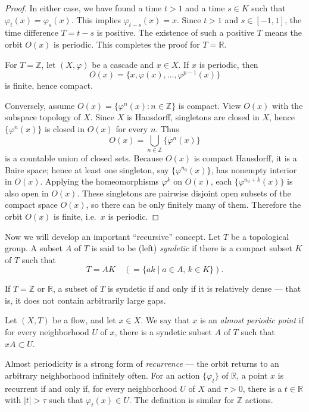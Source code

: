 \begin{proof}
    In either case, we have found a time $t > 1$ and a time $s \in K$ such that $\varphi_t(x) = \varphi_s(x)$. This implies $\varphi_{t-s}(x) = x$. Since $t>1$ and $s \in [-1, 1]$, the time difference $T = t-s$ is positive. The existence of such a positive $T$ means the orbit $O(x)$ is periodic.
    This completes the proof for $T = \mathbb{R}$.

    For $T = \mathbb{Z}$, let $(X,\varphi)$ be a cascade and $x\in X$. If $x$ is periodic, then
    \[
        O(x)=\{x,\varphi(x),\dots,\varphi^{p-1}(x)\}
    \]
    is finite, hence compact.

    Conversely, assume $O(x)=\{\varphi^n(x):n\in\mathbb Z\}$ is compact. View $O(x)$ with the subspace topology of $X$.
    Since $X$ is Hausdorff, singletons are closed in $X$, hence $\{\varphi^n(x)\}$ is closed in $O(x)$ for every $n$.
    Thus
    \[
        O(x)=\bigcup_{n\in\mathbb Z}\{\varphi^n(x)\}
    \]
    is a countable union of closed sets. Because $O(x)$ is compact Hausdorff, it is a Baire space; hence at least one
    singleton, say $\{\varphi^{n_0}(x)\}$, has nonempty interior in $O(x)$.
    Applying the homeomorphisms $\varphi^k$ on $O(x)$, each $\{\varphi^{n_0+k}(x)\}$ is also open in $O(x)$.
    These singletons are pairwise disjoint open subsets of the compact space $O(x)$, so there can be only finitely many of them.
    Therefore the orbit $O(x)$ is finite, i.e.\ $x$ is periodic.
\end{proof}



Now we will develop an important “recursive” concept. Let $T$ be a topological group. A subset $A$ of $T$ is said to be (left) \emph{syndetic} if there is a compact subset $K$ of $T$ such that
\[
    T = AK \quad ( = \{ak \mid a \in A,\, k \in K\} ).
\]

If $T = \mathbb{Z}$ or $\mathbb{R}$, a subset of $T$ is syndetic if and only if it is relatively dense — that is, it does not contain arbitrarily large gaps.




Let $(X,T)$ be a flow, and let $x \in X$. We say that $x$ is an \emph{almost periodic point} if for every neighborhood $U$ of $x$, there is a syndetic subset $A$ of $T$ such that $xA \subset U$.



Almost periodicity is a strong form of \emph{recurrence} — the orbit returns to an arbitrary neighborhood infinitely often. For an action $\{\varphi_t\}$ of $\mathbb{R}$, a point $x$ is recurrent if and only if, for every neighborhood $U$ of $X$ and $\tau > 0$, there is a $t \in \mathbb{R}$ with $|t| > \tau$ such that $\varphi_t(x) \in U$. The definition is similar for $\mathbb{Z}$ actions.

